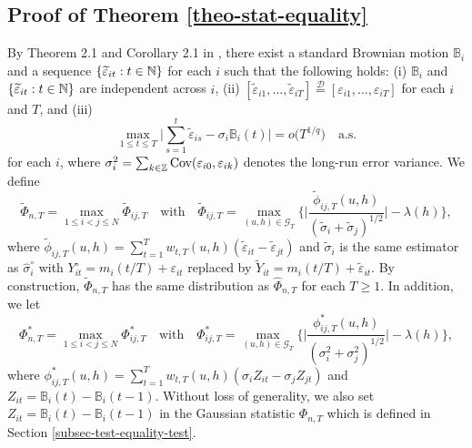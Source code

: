 \documentclass[a4paper,12pt]{article}
\begin{document}
\subsection*{Proof of Theorem \ref{theo-stat-equality}}


By Theorem 2.1 and Corollary 2.1 in \cite{BerkesLiuWu2014}, there exist a standard Brownian motion $\mathbb{B}_i$ and a sequence $\{ \widetilde{\varepsilon}_{it}: t \in \mathbb{N} \}$ for each $i$ such that the following holds: (i) $\mathbb{B}_i$ and $\{ \widetilde{\varepsilon}_{it}: t \in \mathbb{N} \}$ are independent across $i$, (ii) $[\widetilde{\varepsilon}_{i1},\ldots,\widetilde{\varepsilon}_{iT}] \stackrel{\mathcal{D}}{=} [\varepsilon_{i1},\ldots,\varepsilon_{iT}]$ for each $i$ and $T$, and (iii)  
\begin{equation*}
\max_{1 \le t \le T} \Big| \sum\limits_{s=1}^t \widetilde{\varepsilon}_{is} - \sigma_i \mathbb{B}_i(t) \Big| = o\big( T^{1/q} \big) \quad \text{a.s.}  
\end{equation*}
for each $i$, where $\sigma_i^2 = \sum_{k \in \mathbb{Z}} \textnormal{Cov}(\varepsilon_{i0}, \varepsilon_{ik})$ denotes the long-run error variance. We define 
\[ \widetilde{\Phi}_{n,T} = \max_{1\le i < j \le N} \widetilde{\Phi}_{ij,T} \quad \text{with} \quad \widetilde{\Phi}_{ij,T} = \max_{(u,h) \in \mathcal{G}_T} \Big\{ \Big|\frac{\widetilde{\phi}_{ij,T}(u,h)}{(\widetilde{\sigma}_i + \widetilde{\sigma}_j)^{1/2}}\Big| - \lambda(h) \Big\}, \]
where $\widetilde{\phi}_{ij,T}(u,h) = \sum\nolimits_{t=1}^T w_{t,T}(u,h) (\widetilde{\varepsilon}_{it} - \widetilde{\varepsilon}_{jt})$ and $\widetilde{\sigma}_i$ is the same estimator as $\widehat{\sigma}_i^\circ$ with $Y_{it}^\circ = m_i(t/T) + \varepsilon_{it}$ replaced by  $\widetilde{Y}_{it} = m_i(t/T) + \widetilde{\varepsilon}_{it}$. By construction, $\widetilde{\Phi}_{n,T}$ has the same distribution as $\widehat{\Phi}_{n,T}$ for each $T \ge 1$. In addition, we let 
\[ \Phi_{n,T}^* = \max_{1\le i < j \le N} \Phi_{ij,T}^* \quad \text{with} \quad \Phi_{ij,T}^* = \max_{(u,h) \in \mathcal{G}_T} \Big\{ \Big|\frac{\phi_{ij,T}^*(u,h)}{(\sigma_i^2 + \sigma_j^2)^{1/2}}\Big| - \lambda(h) \Big\}, \] 
where $\phi_{ij,T}^*(u,h) = \sum\nolimits_{t=1}^T w_{t,T}(u,h) (\sigma_i Z_{it} - \sigma_j Z_{jt})$ and $Z_{it} = \mathbb{B}_i(t) - \mathbb{B}_i(t-1)$. Without loss of generality, we also set $Z_{it} = \mathbb{B}_i(t) - \mathbb{B}_i(t-1)$ in the Gaussian statistic $\Phi_{n,T}$ which is defined in Section \ref{subsec-test-equality-test}. 
\end{document}
